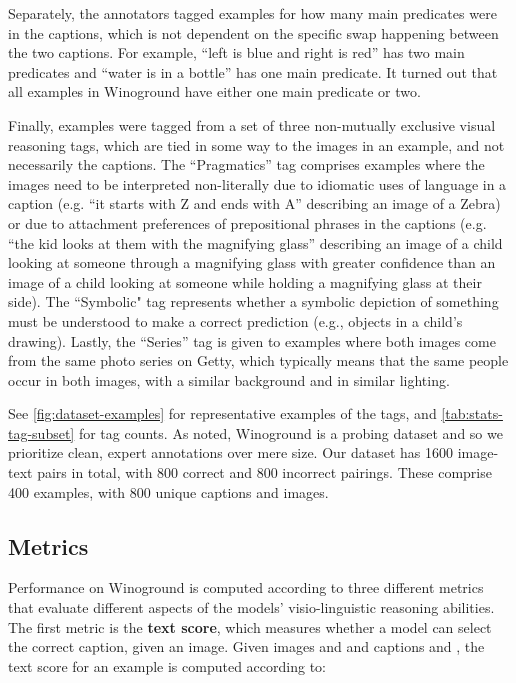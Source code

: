 \documentclass[10pt,twocolumn,letterpaper]{article}
\begin{document}
Separately, the annotators tagged examples for how many main predicates were in the captions, which is not dependent on the specific swap happening between the two captions. For example, ``left is blue and right is red'' has two main predicates and ``water is in a bottle'' has one main predicate. It turned out that all examples in Winoground have either one main predicate or two.

Finally, examples were tagged from a set of three non-mutually exclusive visual reasoning tags, which are tied in some way to the images in an example, and not necessarily the captions. The ``Pragmatics'' tag comprises examples where the images need to be interpreted non-literally due to idiomatic uses of language in a caption (e.g. ``it starts with Z and ends with A'' describing an image of a Zebra) or due to attachment preferences of prepositional phrases in the captions (e.g. ``the kid looks at them with the magnifying glass'' describing an image of a child looking at someone through a magnifying glass with greater confidence than an image of a child looking at someone while holding a magnifying glass at their side). The ``Symbolic" tag represents whether a symbolic depiction of something must be understood to make a correct prediction (e.g., objects in a child's drawing). Lastly, the ``Series'' tag is given to examples where both images come from the same photo series on Getty, which typically means that the same people occur in both images, with a similar background and in similar lighting.

See \cref{fig:dataset-examples} for representative examples of the tags, and \cref{tab:stats-tag-subset} for tag counts. As noted, Winoground is a probing dataset and so we prioritize clean, expert annotations over mere size. Our dataset has 1600 image-text pairs in total, with 800 correct and 800 incorrect pairings. These comprise 400 examples, with 800 unique captions and images.







\subsection{Metrics}\label{sec:metrics}
Performance on Winoground is computed according to three different metrics that evaluate different aspects of the models' visio-linguistic reasoning abilities.
The first metric is the \textbf{text score}, which measures whether a model can select the correct caption, given an image.
Given images  and  and captions  and , the text score for an example  is computed according to:
\end{document}
